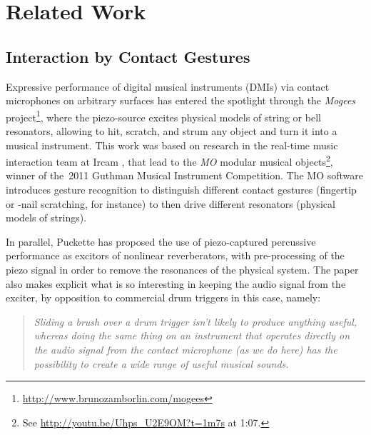 \section{Related Work}\label{sec:related}

\subsection{Interaction by Contact Gestures}

\begin{sloppypar}
Expressive performance of digital musical instruments (DMIs) via contact microphones on arbitrary surfaces has entered the spotlight through the \textit{Mogees} project\footnote{\url{http://www.brunozamborlin.com/mogees}}, where the piezo-source excites physical models of string or bell resonators, allowing to hit, scratch, and strum any object and turn it into a musical instrument.  
%
This work was based on research in the real-time music interaction team at Ircam \cite{Rasamimanana11a,Bevilacqua11b}, that lead to the \textit{MO} modular musical objects\footnote{See \url{http://youtu.be/Uhps_U2E9OM?t=1m7s} at 1:07.}, winner of the~2011 Guthman Musical Instrument Competition.
The MO software introduces gesture recognition to distinguish different contact gestures (fingertip or -nail scratching, for instance) to then drive different resonators (physical models of strings).
\end{sloppypar}

In parallel, Puckette \cite{Puckette-icmc2011-infuriating-nonlinear-reverberator} has proposed the use of piezo-captured percussive performance as excitors of nonlinear reverberators, with pre-processing of the piezo signal in order to remove the resonances of the physical system. The paper also makes explicit what is so interesting in keeping the audio signal from the exciter, by opposition to commercial drum triggers in this case, namely:

\begin{quote}\textit{
Sliding a brush over a drum trigger isn't likely to produce anything useful, whereas doing the same thing on an instrument that operates directly on the audio signal from the contact microphone (as we do here) has the possibility to create a wide range of useful musical sounds.}~\cite{Puckette-icmc2011-infuriating-nonlinear-reverberator}
\end{quote}

